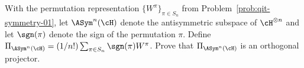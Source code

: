 With the permutation representation $\{W^\pi\}_{\pi\in S_n}$ from Problem~\ref{prob:qit-symmetry-01}, let $\ASym^n(\cH)$ denote the antisymmetric subspace of $\cH^{\otimes n}$ and let $\sgn(\pi)$ denote the sign of the permutation $\pi$. Define $\Pi_{\ASym^n(\cH)}=(1/n!)\sum_{\pi\in S_n}\sgn(\pi)W^\pi$.
Prove that $\Pi_{\ASym^n(\cH)}$ is an orthogonal projector.
